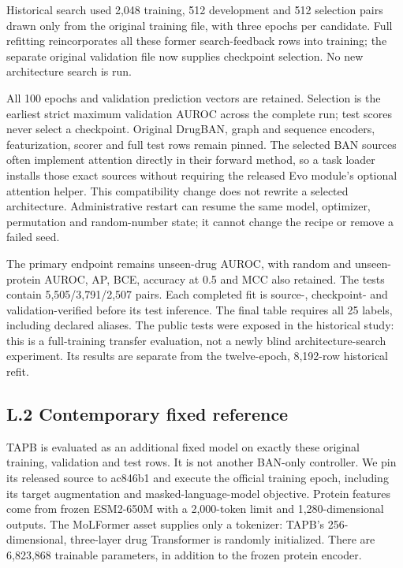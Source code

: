 Historical search used 2,048 training, 512 development and 512 selection pairs drawn only from the original training file, with three epochs per candidate. Full refitting reincorporates all these former search-feedback rows into training; the separate original validation file now supplies checkpoint selection. No new architecture search is run.

All 100 epochs and validation prediction vectors are retained. Selection is the earliest strict maximum validation AUROC across the complete run; test scores never select a checkpoint. Original DrugBAN, graph and sequence encoders, featurization, scorer and full test rows remain pinned. The selected BAN sources often implement attention directly in their forward method, so a task loader installs those exact sources without requiring the released Evo module's optional attention helper. This compatibility change does not rewrite a selected architecture. Administrative restart can resume the same model, optimizer, permutation and random-number state; it cannot change the recipe or remove a failed seed.

The primary endpoint remains unseen-drug AUROC, with random and unseen-protein AUROC, AP, BCE, accuracy at 0.5 and MCC also retained. The tests contain 5,505/3,791/2,507 pairs. Each completed fit is source-, checkpoint- and validation-verified before its test inference. The final table requires all 25 labels, including declared aliases. The public tests were exposed in the historical study: this is a full-training transfer evaluation, not a newly blind architecture-search experiment. Its results are separate from the twelve-epoch, 8,192-row historical refit.

\subsection*{L.2 Contemporary fixed reference}
TAPB \citep{lin2025tapb} is evaluated as an additional fixed model on exactly these original training, validation and test rows. It is not another BAN-only controller. We pin its released source to ac846b1 and execute the official training epoch, including its target augmentation and masked-language-model objective. Protein features come from frozen ESM2-650M \citep{lin2023evolutionary} with a 2,000-token limit and 1,280-dimensional outputs. The MoLFormer asset supplies only a tokenizer: TAPB's 256-dimensional, three-layer drug Transformer is randomly initialized. There are 6,823,868 trainable parameters, in addition to the frozen protein encoder.

